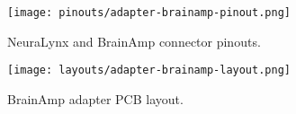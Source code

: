 \begin{figure}[hp]
\begin{center}
\texttt{[image: pinouts/adapter-brainamp-pinout.png]}
\end{center}
\caption{NeuraLynx and BrainAmp connector pinouts.}
\label{fig-brainamp-pinouts}
\end{figure}

\begin{figure}[p]
\begin{center}
\texttt{[image: layouts/adapter-brainamp-layout.png]}
\end{center}
\caption{BrainAmp adapter PCB layout.}\label{fig-brainamp-pcb}
\end{figure}

%
